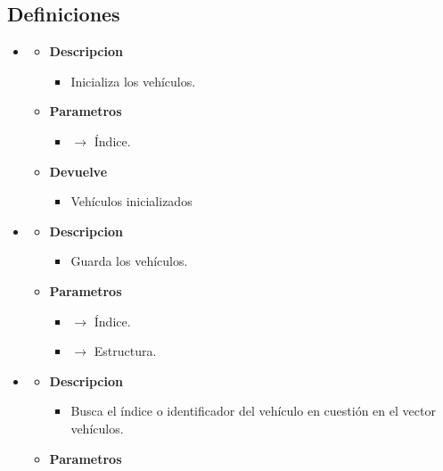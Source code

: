 \subsection{Definiciones}
\begin{itemize}
	\item {}
	\begin{itemize}
		\item \textbf{Descripcion}
        \begin{itemize}
			\item Inicializa los vehículos.
		\end{itemize}
        \item \textbf{Parametros}
		\begin{itemize}
			\item {} $\rightarrow$ Índice.
		\end{itemize}
		\item \textbf{Devuelve}
		\begin{itemize}
			\item Vehículos inicializados
		\end{itemize}
	\end{itemize}
	\item{}
	\begin{itemize}
		\item \textbf{Descripcion}
        \begin{itemize}
			\item Guarda los vehículos.
		\end{itemize}
        \item \textbf{Parametros}
		\begin{itemize}
			\item {} $\rightarrow$ Índice.
            \item {} $\rightarrow$ Estructura.
		\end{itemize}
	\end{itemize}
    \item{}
	\begin{itemize}
		\item \textbf{Descripcion}
        \begin{itemize}
			\item Busca el índice o identificador del vehículo en cuestión en el vector vehículos.
		\end{itemize}
        \item \textbf{Parametros}

\end{itemize}
\end{itemize}
